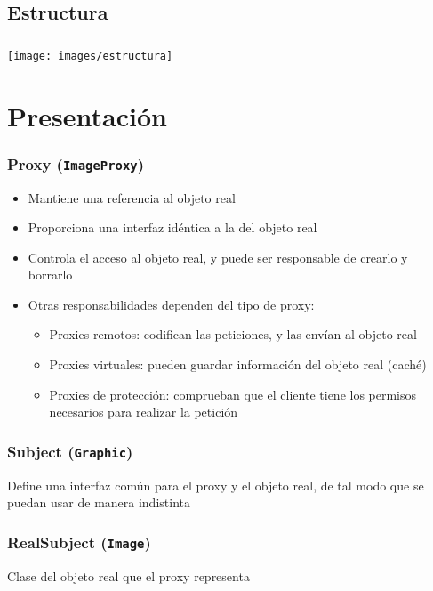\documentclass{beamer}
\begin{document}
\subsection[Estructura]{Estructura}

\begin{frame}{\insertsubsection{}}
  \frametitle{\insertsubsection{}}
  \texttt{[image: images/estructura]}
\end{frame}

\section[Presentación]{Presentación}

\begin{frame}{\insertsection{}}
  \frametitle{Proxy (\texttt{ImageProxy})}
  \begin{itemize}
  \item Mantiene una referencia al objeto real
  \item Proporciona una interfaz idéntica a la del objeto real
  \item Controla el acceso al objeto real, y puede ser responsable de
    crearlo y borrarlo
  \item Otras responsabilidades dependen del tipo de proxy:
    \begin{itemize}
    \item Proxies remotos: codifican las peticiones, y las envían al
      objeto real
    \item Proxies virtuales: pueden guardar información del objeto
      real (caché)
    \item Proxies de protección: comprueban que el cliente tiene los
      permisos necesarios para realizar la petición
    \end{itemize}
  \end{itemize}
\end{frame}

\begin{frame}{\insertsection{}}
  \frametitle{Subject (\texttt{Graphic})}
  Define una interfaz común para el proxy y el objeto real, de tal
  modo que se puedan usar de manera indistinta
\end{frame}

\begin{frame}{\insertsection{}}
  \frametitle{RealSubject (\texttt{Image})}
  Clase del objeto real que el proxy representa
\end{frame}
\end{document}
